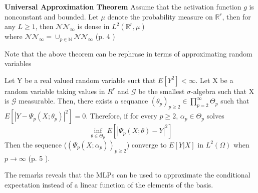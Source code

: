 \begin{theorem}\label{UniversalApproxTheorem}
\textbf{Universal Approximation Theorem} Assume that the activation function $g$ is nonconstant and bounded. Let $\mu$ denote the probability measure on $\mathbb{R}^r$, then for any $L\geq 1$, then $\mathcal{N} \mathcal{N}_\infty$ is dense in $L^2(\mathbb{R}^r, \mu)$\\
where $\mathcal{N} \mathcal{N}_\infty= \cup_{p\in \mathbb{N}} \mathcal{N} \mathcal{N}_\infty$
(p. 4 \parencite{Lelong19})
\end{theorem}
Note that the above theorem can be rephrase in terms of approximating random variables 
\begin{remark}
Let Y be a real valued random variable suct that $E[Y^2]< \infty$. Let X be a random variable taking values in $R^r$ and $\mathcal{G}$ be the smallest $\sigma$-algebra such that X is $\mathcal{G}$ measurable. Then, there exists a sequance $(\theta_p)_{p\geq 2} \in \prod_{p=2}^{\infty} \Theta_{p}$ such that $E[|Y-\Psi_p(X;\theta_p)|^2]=0$. Therefore, if for every $p \geq 2$, $\alpha_p \in \Theta_p$ solves
$$\inf_{\theta\in \Theta_p} E[|\Psi_p(X;\theta)-Y|^2]$$
Then the sequence ($(\Psi_p(X;\alpha_p))_{p\geq 2}$) converge to $E[Y|X]$ in $L^2(\Omega)$ when $p \to \infty$ (p. 5 \parencite{Lelong19}).
\end{remark}
The remarks reveals that the MLPs can be used to approximate the conditional expectation instead of a linear function of the elements of the basis.

